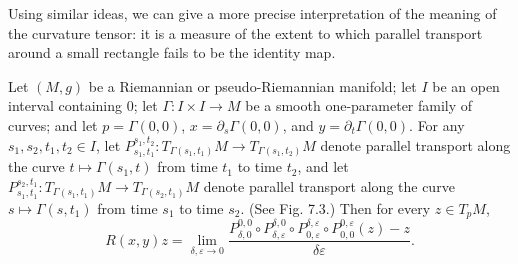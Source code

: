 Using similar ideas, we can give a more precise interpretation of the meaning of the curvature tensor: it is a measure of the extent to which parallel transport around a small rectangle fails to be the identity map.

\begin{theorem}
\label{thm:curvature-endomorphism-formula}
Let $(M, g)$ be a Riemannian or pseudo-Riemannian manifold; let $I$ be an open interval containing $0$; let $\Gamma: I \times I \to M$ be a smooth one-parameter family of curves; and let $p = \Gamma(0,0)$, $x = \partial_s \Gamma(0,0)$, and $y = \partial_t \Gamma(0,0)$. For any $s_1, s_2, t_1, t_2 \in I$, let $P^{s_1,t_2}_{s_1,t_1}: T_{\Gamma(s_1,t_1)} M \to T_{\Gamma(s_1,t_2)} M$ denote parallel transport along the curve $t \mapsto \Gamma(s_1, t)$ from time $t_1$ to time $t_2$, and let $P^{s_2,t_1}_{s_1,t_1}: T_{\Gamma(s_1,t_1)} M \to T_{\Gamma(s_2,t_1)} M$ denote parallel transport along the curve $s \mapsto \Gamma(s, t_1)$ from time $s_1$ to time $s_2$. (See Fig. 7.3.) Then for every $z \in T_p M$,
\begin{equation}
R(x,y)z = \lim_{\delta, \varepsilon \to 0} \frac{P^{0,0}_{\delta,0} \circ P^{\delta,0}_{\delta,\varepsilon} \circ P^{\delta,\varepsilon}_{0,\varepsilon} \circ P^{0,\varepsilon}_{0,0}(z) - z}{\delta\varepsilon}.
\tag{7.10}
\end{equation}
\end{theorem}


